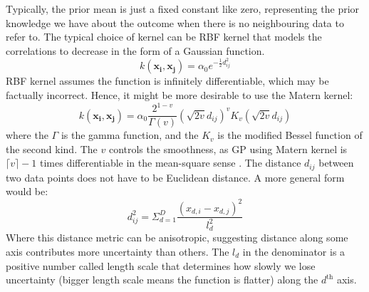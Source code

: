 \documentclass[journal]{IEEEtran}
\begin{document}
Typically, the prior mean is just a fixed constant like zero, representing the prior knowledge we have about the outcome when there is no neighbouring data to refer to.
The typical choice of kernel can be RBF kernel that models the correlations to decrease in the form of a Gaussian function.
\begin{equation}
k(\bm{x_i}, \bm{x_j}) = \alpha_0 e^{-\frac{1}{2} d_{ij}^2}
\label{RBF_kernel}
\end{equation}
RBF kernel assumes the function is infinitely differentiable, which may be factually incorrect. Hence, it might be more desirable to use the Matern kernel:
\begin{equation}
k(\bm{x_i}, \bm{x_j}) = \alpha_0 \frac{2^{1-v}}{\Gamma(v)}
(\sqrt{2v} d_{ij})^v K_v(\sqrt{2v} d_{ij})
\label{Matern}
\end{equation}
where the $\Gamma$ is the gamma function, and the $K_v$ is the modified Bessel function of the second kind. The $v$ controls the smoothness, as GP using Matern kernel is $\lceil v \rceil - 1$ times differentiable in the mean-square sense \cite{GP, Matern}.
The distance $d_{ij}$ between two data points does not have to be Euclidean distance. A more general form would be:
\begin{equation}
d_{ij}^2 = \Sigma_{d=1}^D \frac{(x_{d, i} - x_{d, j})^2}{l_d^2}
\label{distance_metric}
\end{equation}
Where this distance metric can be anisotropic, suggesting distance along some axis contributes more uncertainty than others. 
The $l_d$ in the denominator is a positive number called length scale that determines how slowly we lose uncertainty (bigger length scale means the function is flatter) along the $d^\text{th}$ axis.
\end{document}
